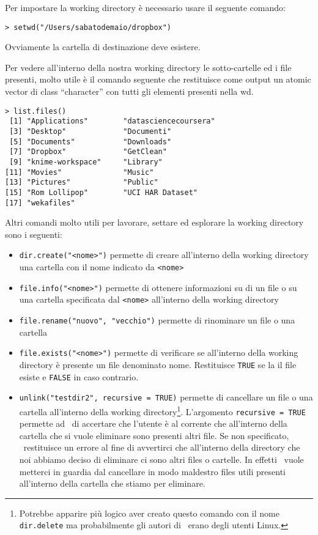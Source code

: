 Per impostare la working directory è necessario usare il seguente comando:

\begin{lstlisting}
> setwd("/Users/sabatodemaio/dropbox")
\end{lstlisting}

Ovviamente la cartella di destinazione deve esistere.

Per vedere all'interno della nostra working directory le sotto-cartelle ed i file presenti, molto utile è il comando seguente che restituisce come output un atomic vector di class ``character'' con tutti gli elementi presenti nella wd.

\begin{lstlisting}
> list.files()
 [1] "Applications"        "datasciencecoursera"
 [3] "Desktop"             "Documenti"          
 [5] "Documents"           "Downloads"          
 [7] "Dropbox"             "GetClean"           
 [9] "knime-workspace"     "Library"            
[11] "Movies"              "Music"              
[13] "Pictures"            "Public"             
[15] "Rom Lollipop"        "UCI HAR Dataset"    
[17] "wekafiles"          
\end{lstlisting}


Altri comandi molto utili per lavorare, settare ed esplorare la working directory sono i seguenti:
\begin{itemize}

\item \lstinline!dir.create("<nome>")! permette di creare all'interno della working directory una cartella con il nome indicato da \lstinline!<nome>!
\item \lstinline!file.info("<nome>")! permette di ottenere informazioni su di un file o su una cartella specificata dal \lstinline!<nome>! all'interno della working directory
\item \lstinline!file.rename("nuovo", "vecchio")!  permette di rinominare un file o una cartella
\item \lstinline!file.exists("<nome>")! permette di verificare se all'interno della working directory è presente un file denominato \textsf{nome}. Restituisce \lstinline!TRUE! se la il file esiste e \lstinline!FALSE! in caso contrario.
\item \lstinline!unlink("testdir2", recursive = TRUE)! permette di cancellare un file o una cartella all'interno della working directory\footnote{Potrebbe apparire più logico aver creato questo comando con il nome \lstinline!dir.delete! ma probabilmente gli autori di \erre\ erano degli utenti Linux.}. L'argomento \lstinline!recursive = TRUE! permette ad \erre\ di accertare che l'utente è al corrente che all'interno della cartella che si vuole eliminare sono presenti altri file. Se non specificato, \erre\ restituisce un errore al fine di avvertirci che all'interno della directory che noi abbiamo deciso di eliminare ci sono altri files o cartelle. In effetti \erre\ vuole metterci in guardia dal cancellare in modo maldestro files utili presenti all'interno della cartella che stiamo per eliminare.
\end{itemize}

